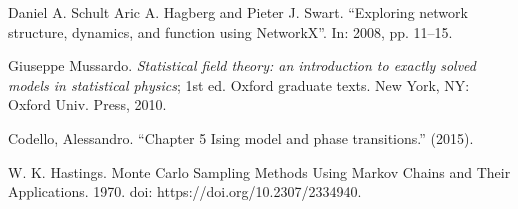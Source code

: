 \documentclass[11pt,a4paper]{article}
\numberwithin{thm}{section}
\numberwithin{prop}{section}
\numberwithin{obs}{section}
\numberwithin{equation}{section}
\numberwithin{defin}{section}
\begin{document}


\tableofcontents









\begin{thebibliography}{9}
    Daniel A. Schult Aric A. Hagberg and Pieter J. Swart. “Exploring network structure,
    dynamics, and function using NetworkX”. In: 2008, pp. 11–15.

    Giuseppe Mussardo. \emph{Statistical field theory: an introduction to exactly solved models in
    statistical physics}; 1st ed. Oxford graduate texts. New York, NY: Oxford Univ. Press, 2010.

    Codello, Alessandro. “Chapter 5 Ising model and phase transitions.” (2015).

    W. K. Hastings. Monte Carlo Sampling Methods Using Markov Chains and Their Applications. 1970. doi: https://doi.org/10.2307/2334940.
    \end{thebibliography}
\end{document}
